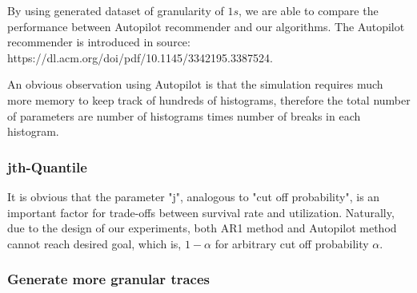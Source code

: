 \documentclass{article}
\begin{document}
\begin{flushleft}
By using generated dataset of granularity of $1s$, we are able to compare the
performance between Autopilot recommender and our algorithms. The Autopilot
recommender is introduced in source:
https://dl.acm.org/doi/pdf/10.1145/3342195.3387524.

An obvious observation using Autopilot is that the simulation requires much more
memory to keep track of hundreds of histograms, therefore the total number of
parameters are number of histograms times number of breaks in each histogram.
\end{flushleft}

\subsubsection{jth-Quantile}
It is obvious that the parameter "j", analogous to "cut off probability", is an
important factor for trade-offs between survival rate and utilization.
Naturally, due to the design of our experiments, both AR1 method and Autopilot
method cannot reach desired goal, which is, $1 - \alpha$ for arbitrary cut off
probability $\alpha$. 

\subsubsection{Generate more granular traces}
\end{document}

